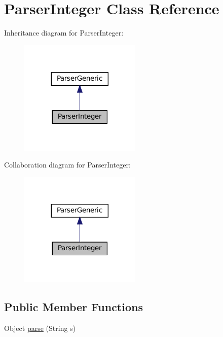 \hypertarget{classParserInteger}{}\section{Parser\+Integer Class Reference}
\label{classParserInteger}


Inheritance diagram for Parser\+Integer\+:
\nopagebreak
\begin{figure}[H]
\begin{center}
\leavevmode
\includegraphics[width=164pt]{classParserInteger__inherit__graph}
\end{center}
\end{figure}


Collaboration diagram for Parser\+Integer\+:
\nopagebreak
\begin{figure}[H]
\begin{center}
\leavevmode
\includegraphics[width=164pt]{classParserInteger__coll__graph}
\end{center}
\end{figure}
\subsection*{Public Member Functions}
\begin{DoxyCompactItemize}
\item 
Object \hyperlink{classParserInteger_a56a141fdc62fbc8589b4259a0e65cbaa}{parse} (String s)
\end{DoxyCompactItemize}


